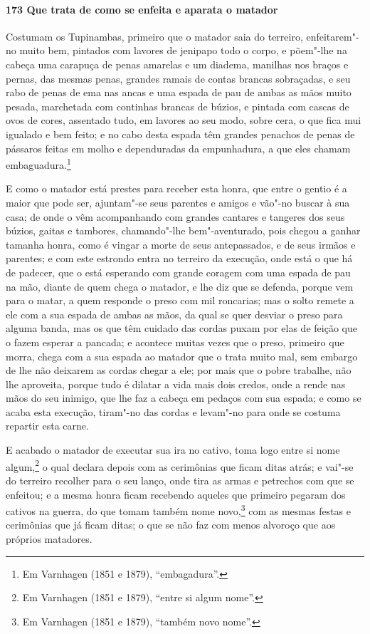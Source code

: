 \begin{linenumbers}
\paragraph{173 Que trata de como se enfeita e aparata o matador}\quad
Costumam os Tupinambas, primeiro que o matador saia do terreiro, enfeitarem"-no muito bem,
pintados com lavores de jenipapo todo o corpo, e põem"-lhe na cabeça uma carapuça de penas
amarelas e um diadema, manilhas nos braços e pernas, das mesmas penas, grandes ramais de
contas brancas sobraçadas, e seu rabo de penas de ema nas ancas e uma espada de pau de
ambas as mãos muito pesada, marchetada com continhas brancas de búzios, e pintada com
cascas de ovos de cores, assentado tudo, em lavores ao seu modo, sobre cera, o que fica
mui igualado e bem feito; e no cabo desta espada têm grandes penachos de penas de pássaros
feitas em molho e dependuradas da empunhadura, a que eles chamam embaguadura.\footnote{ Em
Varnhagen (1851 e 1879), ``embagadura''.}

E como o matador está prestes para receber esta honra, que entre o gentio é a maior que
pode ser, ajuntam"-se seus parentes e amigos e vão"-no buscar à sua casa; de onde o vêm
acompanhando com grandes cantares e tangeres dos seus búzios, gaitas e tambores,
chamando"-lhe bem"-aventurado, pois chegou a ganhar tamanha honra, como é vingar a morte de
seus antepassados, e de seus irmãos e parentes; e com este estrondo entra no terreiro da
execução, onde está o que há de padecer, que o está esperando com grande coragem com uma
espada de pau na mão, diante de quem chega o matador, e lhe diz que se defenda, porque vem
para o matar, a quem responde o preso com mil roncarias; mas o solto remete a ele com a
sua espada de ambas as mãos, da qual se quer desviar o preso para alguma banda, mas os que
têm cuidado das cordas puxam por elas de feição que o fazem esperar a pancada; e acontece
muitas vezes que o preso, primeiro que morra, chega com a sua espada ao matador que o
trata muito mal, sem embargo de lhe não deixarem as cordas chegar a ele; por mais que o
pobre trabalhe, não lhe aproveita, porque tudo é dilatar a vida mais dois credos, onde a
rende nas mãos do seu inimigo, que lhe faz a cabeça em pedaços com sua espada; e como se
acaba esta execução, tiram"-no das cordas e levam"-no para onde se costuma repartir esta
carne.

E acabado o matador de executar sua ira no cativo, toma logo entre si nome
algum,\footnote{ Em Varnhagen (1851 e 1879), ``entre si algum nome''.} o qual declara
depois com as cerimônias que ficam ditas atrás; e vai"-se do terreiro recolher para o seu
lanço, onde tira as armas e petrechos com que se enfeitou; e a mesma honra ficam recebendo
aqueles que primeiro pegaram dos cativos na guerra, do que tomam também nome
novo,\footnote{ Em Varnhagen (1851 e 1879), ``também novo nome''.} com as mesmas festas e
cerimônias que já ficam ditas; o que se não faz com menos alvoroço que aos próprios
matadores.


\end{linenumbers}
